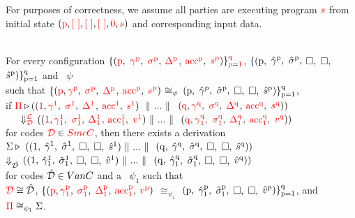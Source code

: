 \begin{axiom}
\label{correctness assumption}%
For purposes of correctness, 
we assume all parties are executing program $\RT\stmt$ 
from initial state $(\RT\pid, \RT{[\ ]}, \RT{[\ ]}, \RT{[\ ]}, \RT\AccZ, \RT\stmt)$
and corresponding input data. 
\end{axiom}



\begin{theorem}%
\label{Thm: app correctness}
~\\
For every configuration $\{(\RT\pid,\ \rrgamma^{\RT{\pid}}_{},$ $\rrsigma^{\RT{\pid}}_{},$ $\RT\DMap^{\RT{\pid}}_{}$, $\rAcc^{\RT{\pid}}_{},$ $\rstmt^{\RT\pid})\}^{\RT\pidZ}_{\RT\pid = \RT\pidA}$, 
$\{(\pid,$ $\hgamma^\pid,$ $\hsigma^\pid,$ $\bsq,$ $\bsq,$ $\hstmt^\pid)\}^{\pidZ}_{\pid = \pidA}$ and \LocMap\ $\psi$ 
\\ such that $\{(\RT\pid, \rrgamma^{\RT{\pid}}_{},$ $\rrsigma^{\RT{\pid}}_{},$ $\RT\DMap^{\RT{\pid}}_{}$, $\rAcc^{\RT{\pid}}_{},$ $\rstmt^{\RT{\pid}})$ $\Pcong$ 
$(\pid,$ $\hgamma^\pid,$ $\hsigma^\pid,$ $\bsq,$ $\bsq,$ $\hstmt^\pid)\}^{\pidZ}_{\pid = \pidA}$, 
\\ %
if $\RT\Pi \deriv ((\RT\pidA, \rrgamma^{\RT{\pidA}}_{},$ $\rrsigma^{\RT{\pidA}}_{},$ $\RT\DMap^{\RT{\pidA}}_{}$, $\rAcc^{\RT{\pidA}}_{},$ $\rstmt^{\RT{\pidA}})\ \Mid ...\Mid$ 
	$(\RT\pidZ, \rrgamma^{\RT{\pidZ}}_{},$ $\rrsigma^{\RT{\pidZ}}_{},$ $\RT\DMap^{\RT{\pidZ}}_{}$, $\rAcc^{\RT{\pidZ}}_{},$ $\rstmt^{\RT{\pidZ}}))$ 
	\\ \-\ \-\ \-\ $\Deval{\RT\locLL}{\RT\codeLL}$ 
	$((\RT\pidA, {\rrgamma^{\RT{\pidA}}_{\RT1}},$ ${\rrsigma^{\RT{\pidA}}_{\RT1}},$ $\RT\DMap^{\RT{\pidA}}_{\RT1}$, $\rAcc^{\RT{\pidA}}_{\RT1},$ ${\RT\val^{\RT{\pidA}}_{}}) \Mid ... \Mid$ 
	$(\RT\pidZ, {\rrgamma^{\RT{\pidZ}}_{\RT1}},$ ${\rrsigma^{\RT{\pidZ}}_{\RT1}},$ $\RT\DMap^{\RT{\pidZ}}_{\RT1}$, $\rAcc^{\RT{\pidZ}}_{\RT1},$ $\RT\val^{\RT{\pidZ}}))$ 
\\ for codes $\RT\codeLL \in \RT{\piccoCodes}$,
then there exists a derivation 
\\ %
$\Sigma \deriv\ ((\pidA,$ $\hgamma^\pidA,$ $\hsigma^\pidA,$ $\bsq,$ $\bsq,$ $\hstmt^\pidA)\Mid ...\Mid $
	$(\pidZ,$ $\hgamma^\pidZ,$ $\hsigma^\pidZ,$ $\bsq,$ $\bsq,$ $\hstmt^\pidZ))$ 
	\\ $\Deval{}{\codeVLL}$ 
	$((\pidA,$ $\hgamma^\pidA_1,$ $\hsigma^\pidA_1,$ $\bsq,$ $\bsq,$ $\hval^\pidA)\Mid...\Mid$
	$(\pidZ,$ $\hgamma^\pidZ_1,$ $\hsigma^\pidZ_1,$ $\bsq,$ $\bsq,$ $\hval^\pidZ))$ 
\\ for codes $\codeVLL \in \vanillaCodes$ 
and 
a \LocMap\ $\psi_1$ 
such that 
\\ %
$\RT\codeLL \cong \codeVLL$, 
$\{(\RT\pid, {\rrgamma^{\RT{\pid}}_{\RT1}},$ ${\rrsigma^{\RT{\pid}}_{\RT1}},$ $\RT\DMap^{\RT{\pid}}_{\RT1}$, $\rAcc^{\RT{\pid}}_{\RT1},$ $\RT\val^{\RT{\pid}}_{})$ $\cong_{\psi_1}$ 
$(\pid,$ $\hgamma^\pid_1,$ $\hsigma^\pid_1,$ $\bsq,$ $\bsq,$ $\hval^\pid)\}^{\pidZ}_{\pid = \pidA}$, 
and $\RT\Pi \cong_{\psi_1} \Sigma$.
\end{theorem}




